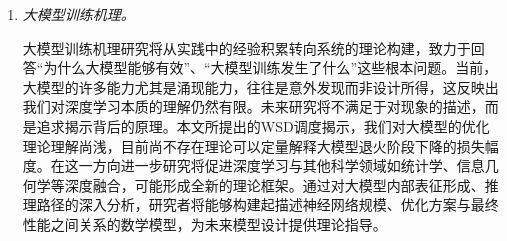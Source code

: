 \begin{enumerate}
\item \textit{大模型训练机理。} 


大模型训练机理研究将从实践中的经验积累转向系统的理论构建，致力于回答“为什么大模型能够有效”、“大模型训练发生了什么”这些根本问题。当前，大模型的许多能力尤其是涌现能力，往往是意外发现而非设计所得，这反映出我们对深度学习本质的理解仍然有限。未来研究将不满足于对现象的描述，而是追求揭示背后的原理。本文所提出的WSD调度揭示，我们对大模型的优化理论理解尚浅，目前尚不存在理论可以定量解释大模型退火阶段下降的损失幅度。在这一方向进一步研究将促进深度学习与其他科学领域如统计学、信息几何学等深度融合，可能形成全新的理论框架。通过对大模型内部表征形成、推理路径的深入分析，研究者将能够构建起描述神经网络规模、优化方案与最终性能之间关系的数学模型，为未来模型设计提供理论指导。

\end{enumerate}